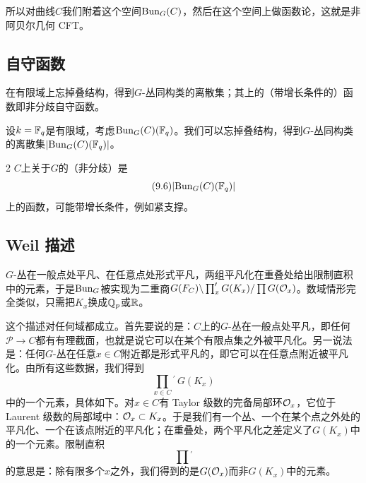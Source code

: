 所以对曲线$C$我们附着这个空间$\mathrm{Bun}_G(C)$，然后在这个空间上做函数论，这就是非阿贝尔几何 CFT。

\subsection{自守函数}
\begin{sectionkey}
在有限域上忘掉叠结构，得到$G$-丛同构类的离散集；其上的（带增长条件的）函数即非分歧自守函数。
\end{sectionkey}

设$k=\mathbb{F}_q$是有限域，考虑$\mathrm{Bun}_G(C)(\mathbb{F}_q)$。我们可以忘掉叠结构，得到$G$-丛同构类的离散集$|\mathrm{Bun}_G(C)(\mathbb{F}_q)|$。

\begin{srcdef}{2}
$C$上关于$G$的（非分歧）是
\begin{equation}\tag{9.6}
|\mathrm{Bun}_G(C)(\mathbb{F}_q)|
\end{equation}
上的函数，可能带增长条件，例如紧支撑。
\end{srcdef}

\subsection{Weil 描述}
\begin{sectionkey}
$G$-丛在一般点处平凡、在任意点处形式平凡，两组平凡化在重叠处给出限制直积中的元素，于是$\mathrm{Bun}_G$被实现为二重商$G(F_C)\backslash\prod'_xG(K_x)/\prod G(\mathcal{O}_x)$。数域情形完全类似，只需把$K_x$换成$\mathbb{Q}_p$或$\mathbb{R}$。
\end{sectionkey}

这个描述对任何域都成立。首先要说的是：$C$上的$G$-丛在一般点处平凡，即任何$\mathcal{P}\to C$都有有理截面，也就是说它可以在某个有限点集之外被平凡化。另一说法是：任何$G$-丛在任意$x\in C$附近都是形式平凡的，即它可以在任意点附近被平凡化。由所有这些数据，我们得到
\begin{equation}\tag{9.7}
\prod_{x\in C}{}^{\prime}\,G(K_x)
\end{equation}
中的一个元素，具体如下。对$x\in C$有 Taylor 级数的完备局部环$\mathcal{O}_x$，它位于 Laurent 级数的局部域中：$\mathcal{O}_x\subset K_x$。于是我们有一个丛、一个在某个点之外处的平凡化、一个在该点附近的平凡化；在重叠处，两个平凡化之差定义了$G(K_x)$中的一个元素。限制直积
\[
\prod{}^{\prime}
\]
的意思是：除有限多个$x$之外，我们得到的是$G(\mathcal{O}_x)$而非$G(K_x)$中的元素。

